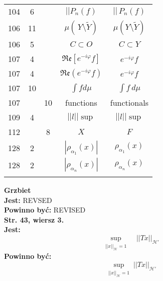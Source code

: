 \documentclass[a4paper,11pt]{article}
\newcommand{\wt}{\widetilde}
\newcommand{\mc}{\mathcal}
\newcommand{\mf}{\mathfrak}
\newcommand{\al}{\alpha}
\newcommand{\vp}{\varphi}
\newcommand{\Hc}{\mc{H}}
\newcommand{\subs}{\subset}
\newcommand{\setm}{\setminus}
\newcommand{\Real}{\mf{Re}}
\newcommand{\Int}{\int\limits}
\newcommand{\IntCaD}[2] { \Int #1 \, d#2 } %
\newcommand{\norm}[1]{\left|\left| #1 \right|\right|}
\newcommand{\tb}{\textbf}
\newcommand{\noi}{\noindent}
\newcommand{\StrWg}[2]{\tb{Str. #1, wiersz #2.}}
\newcommand{\Jest}{\tb{Jest: }}
\newcommand{\Pow}{\tb{Powinno być: }}
\begin{document}
\begin{center}
\begin{tabular}{|c|c|c|c|c|}
    104 & 6 & & $||P_{ n }( f )$ & $|| \, P_{ n }( f )$ \\
    106 & 11 & & $\mu( \, Y \setm \wt{ Y } )$
           & $\mu( Y \setm \wt{ Y } )$ \\
    106 & 5 & & $C \subs O$ & $C \subs Y$ \\
    107 & 4 & & $\Real[ e^{ -i \vp } f ]$ & $e^{ -i \vp } f$ \\
    107 & 4 & & $\Real( e^{ -i \vp } f )$ & $e^{ -i \vp } f$ \\
    107 & 10 & & $\int\! fd\mu$ & $\IntCaD{ f }{ \mu }$ \\
    107 & & 10 & functions & functionals \\
    109 & 4 & & $\norm{ l }\!\sup$ & $\norm{ l } \sup$ \\
    112 & & 8 & $X$ & $F$ \\
    128 & 2 & & $| \rho_{ \al_{ 1 } }( x ) |$ & $\rho_{ \al_{ 1 } }( x )$ \\
    128 & 2 & & $| \rho_{ \al_{ n } }( x ) |$ & $\rho_{ \al_{ n } }( x )$ \\
    & & & & \\ \hline
  \end{tabular}
\end{center}
\noi
\tb{Grzbiet} \\
\Jest REVSED \\
\Pow REVISED \\
\StrWg{43}{3} \\
\Jest
\begin{equation*}
  \sup_{ \substack{ \norm{ x }_{ \Hc } = 1 } } \;\;\; \norm{ T x }_{ \Hc' }
\end{equation*}
\Pow
\begin{equation*}
  \sup_{ \substack{ \norm{ x }_{ \Hc } = 1 } } \norm{ T x }_{ \Hc' }
\end{equation*}





 {}
\end{document}
